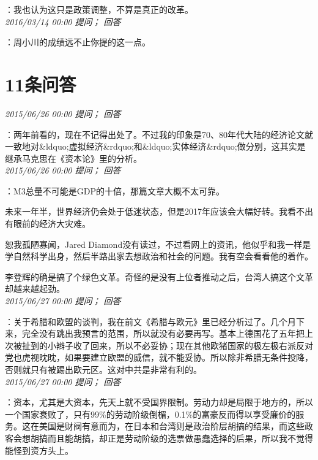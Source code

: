 \documentclass[twocolumn]{ctexart}
\begin{document}
：我也认为这只是政策调整，不算是真正的改革。\\

\textit{\hfill\noindent\small 2016/03/14 00:00 提问； 回答}

：周小川的成绩远不止你提的这一点。\\

\section{11条问答}

\textit{\hfill\noindent\small 2015/06/26 00:00 提问； 回答}

：两年前看的，现在不记得出处了。不过我的印象是70、80年代大陆的经济论文就一致地对\&ldquo;虚拟经济\&rdquo;和\&ldquo;实体经济\&rdquo;做分别，这其实是继承马克思在《资本论》里的分析。\\

\textit{\hfill\noindent\small 2015/06/26 00:00 提问； 回答}

：M3总量不可能是GDP的十倍，那篇文章大概不太可靠。

未来一年半，世界经济仍会处于低迷状态，但是2017年应该会大幅好转。我看不出有眼前的经济大灾难。

恕我孤陋寡闻，Jared Diamond没有读过，不过看网上的资讯，他似乎和我一样是学自然科学出身，然后半路出家去想政治和社会的问题。我有空会看看他的着作。

李登辉的确是搞了个绿色文革。奇怪的是没有上位者推动之后，台湾人搞这个文革却越来越起劲。\\

\textit{\hfill\noindent\small 2015/06/27 00:00 提问； 回答}

：关于希腊和欧盟的谈判，我在前文《希腊与欧元》里已经分析过了。几个月下来，完全没有跳出我预言的范围，所以就没有必要再写。基本上德国花了五年把上次被扯到的小辫子收了回来，所以不必妥协；现在其他欧猪国家的极左极右派反对党也虎视眈眈，如果要建立欧盟的威信，就不能妥协。所以除非希腊无条件投降，否则就只有被踢出欧元区。这对中共是非常有利的。\\

\textit{\hfill\noindent\small 2015/06/27 00:00 提问； 回答}

：资本，尤其是大资本，先天上就不受国界限制。劳动力却是局限于地方的，所以一个国家衰败了，只有99\%的劳动阶级倒楣，0.1\%的富豪反而得以享受廉价的服务。这在美国是财阀有意而为，在日本和台湾则是政治阶层胡搞的结果，而这些政客会想胡搞而且能胡搞，却正是劳动阶级的选票做愚蠢选择的后果，所以我不觉得能怪到资方头上。
\end{document}
